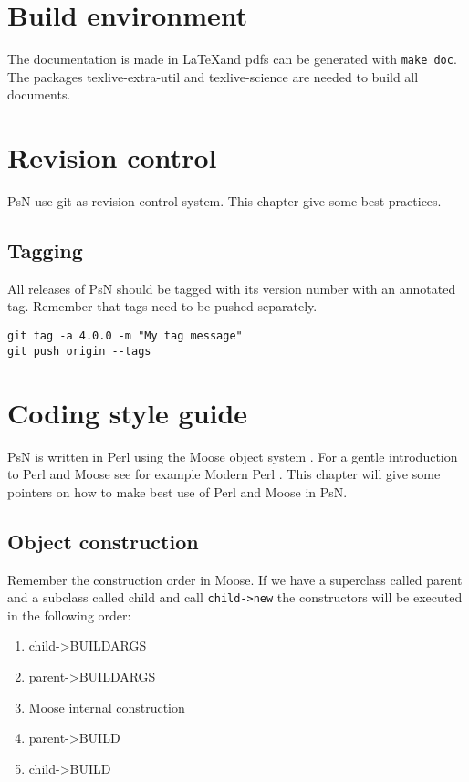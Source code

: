 \section{Build environment}
The documentation is made in \LaTeX and pdfs can be generated with \verb|make doc|. The
packages texlive-extra-util and texlive-science are needed to build all documents.

\section{Revision control}
PsN use git as revision control system. This chapter give some best practices.

\subsection{Tagging}
All releases of PsN should be tagged with its version number with an annotated tag. Remember
that tags need to be pushed separately.
\begin{verbatim}
git tag -a 4.0.0 -m "My tag message"
git push origin --tags
\end{verbatim}

\section{Coding style guide}
PsN is written in Perl using the Moose object system \cite{Moose}. For a gentle introduction to Perl and Moose see for example Modern Perl \cite{modern}. This chapter will give some pointers on how to make best use of Perl and Moose in PsN. 

\subsection{Object construction}

Remember the construction order in Moose. If we have a superclass called parent and a subclass called child and call \verb|child->new| the constructors will be executed in the following order:

\begin{enumerate}
	\item child->BUILDARGS
	\item parent->BUILDARGS
	\item Moose internal construction
	\item parent->BUILD
	\item child->BUILD
\end{enumerate}


